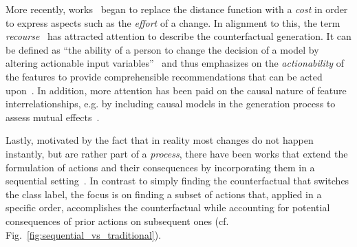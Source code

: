 \documentclass[runningheads, envcountsame, a4paper]{llncs}
\begin{document}
More recently, works~\cite{ustunActionableRecourseLinear2019,karimiAlgorithmicRecourseImperfect2020a,ramakrishnanSynthesizingActionSequences2020} began to replace the distance function with a \emph{cost} in order to express aspects such as the \emph{effort} of a change. 
In alignment to this, the term \emph{recourse}~\cite{joshiRealisticIndividualRecourse2019,ustunActionableRecourseLinear2019,karimiAlgorithmicRecourseImperfect2020a,karimiSurveyAlgorithmicRecourse2020,poyiadziFACEFeasibleActionable2020,downsCRUDSCounterfactualRecourse2020} has attracted attention to describe the counterfactual generation.
It can be defined as \enquote{the ability of a person to change the decision of a model by altering actionable input variables}~\cite{ustunActionableRecourseLinear2019} and thus emphasizes on the \emph{actionability} of the features to provide comprehensible recommendations that can be acted upon~\cite{karimiSurveyAlgorithmicRecourse2020}.
In addition, more attention has been paid on the causal nature of feature interrelationships, e.g. by including causal models in the generation process to assess mutual effects~\cite{downsCRUDSCounterfactualRecourse2020,karimiAlgorithmicRecourseImperfect2020a,mahajanPreservingCausalConstraints2020}.

Lastly, motivated by the fact that in reality most changes do not happen instantly, but are rather part of a \emph{process}, there have been works that extend the formulation of actions and their consequences by incorporating them in a sequential setting~\cite{ramakrishnanSynthesizingActionSequences2020,shavitExtractingIncentivesBlackBox2019}. In contrast to simply finding the counterfactual that switches the class label, the focus is on finding a subset of actions that, applied in a specific order, accomplishes the counterfactual while accounting for potential consequences of prior actions on subsequent ones (cf. Fig.~\ref{fig:sequential_vs_traditional}).
\end{document}
